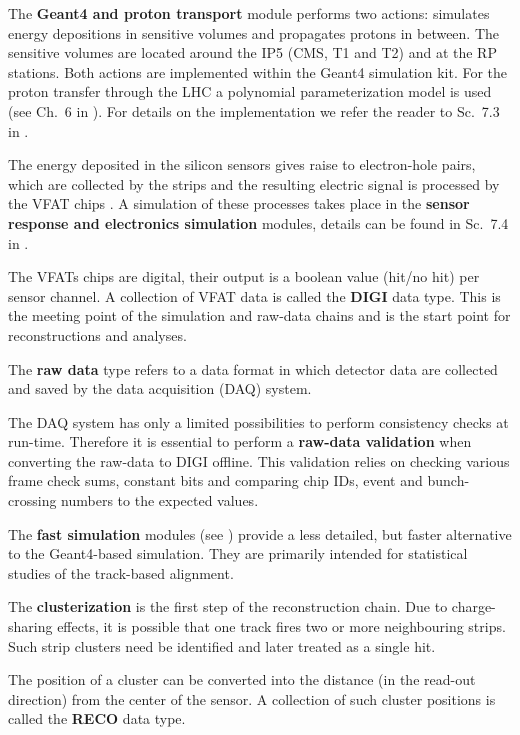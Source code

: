 \> The {\bf Geant4 and proton transport} module performs two actions: simulates energy depositions in sensitive volumes and propagates protons in between. The sensitive volumes are located around the IP5 (CMS, T1 and T2) and at the RP stations. Both actions are implemented within the Geant4  simulation kit. For the proton transfer through the LHC a polynomial parameterization model is used (see Ch.~6 in ). For details on the implementation we refer the reader to Sc.~7.3 in .

\> The energy deposited in the silicon sensors gives raise to electron-hole pairs, which are collected by the strips and the resulting electric signal is processed by the VFAT chips . A simulation of these processes takes place in the {\bf sensor response and electronics simulation} modules, details can be found in Sc.~7.4 in .

\> The VFATs chips are digital, their output is a boolean value (hit/no hit) per sensor channel. A collection of VFAT data is called the {\bf DIGI} data type. This is the meeting point of the simulation and raw-data chains and is the start point for reconstructions and analyses.

\> The {\bf raw data} type refers to a data format in which detector data are collected and saved by the data acquisition (DAQ) system.

\> The DAQ system has only a limited possibilities to perform consistency checks at run-time. Therefore it is essential to perform a {\bf raw-data validation} when converting the raw-data to DIGI offline. This validation relies on checking various frame check sums, constant bits and comparing chip IDs, event and bunch-crossing numbers to the expected values.

\> The {\bf fast simulation} modules (see ) provide a less detailed, but faster alternative to the Geant4-based simulation. They are primarily intended for statistical studies of the track-based alignment.

\> The {\bf clusterization} is the first step of the reconstruction chain. Due to charge-sharing effects, it is possible that one track fires two or more neighbouring strips. Such strip clusters need be identified and later treated as a single hit.

\> The position of a cluster can be converted into the distance (in the read-out direction) from the center of the sensor. A collection of such cluster positions is called the {\bf RECO} data type.

